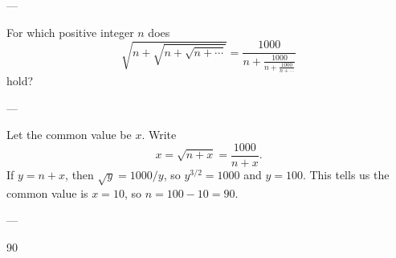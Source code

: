 
---

For which positive integer $n$ does \[\sqrt{n+\sqrt{n+\sqrt{n+\cdots}}}=\frac{1000}{n+\frac{1000}{n+\frac{1000}{n+\cdots}}}\]
hold?

---

Let the common value be $x$. Write \[x=\sqrt{n+x}=\frac{1000}{n+x}.\]
If $y=n+x$, then $\sqrt y=1000/y$, so $y^{3/2}=1000$ and $y=100$. This tells us the common value is $x=10$, so $n=100-10=90$.

---

90

